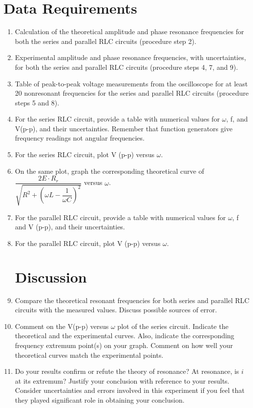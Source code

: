 \section{{\bf Data Requirements}}
\begin{enumerate}[resume]

\item Calculation of the theoretical amplitude and phase resonance frequencies for both the series and parallel RLC circuits (procedure step 2).

\item Experimental amplitude and phase resonance frequencies, with uncertainties, for both the series and parallel RLC circuits (procedure steps 4, 7, and 9).

\item Table of peak-to-peak voltage measurements from the oscilloscope for at least 20 nonresonant frequencies for the series and parallel RLC circuits (procedure steps 5 and 8).

\item For the series RLC circuit, provide a table with numerical values for $\omega$, f, and V(p-p), and their uncertainties. Remember that function generators give frequency readings not angular frequencies.

\item For the series RLC circuit, plot V (p-p) versus $\omega$.

\item On the same plot, graph the corresponding theoretical curve of $\dfrac{2E\cdot R_r}{\sqrt{R^2+\left(\omega L-\dfrac{1}{\omega C}\right)^2}}$ versus $\omega$.

\item For the parallel RLC circuit, provide a table with numerical values for $\omega$, f and V (p-p), and their uncertainties.

\item For the parallel RLC circuit, plot V (p-p) versus $\omega$.

\section{Discussion}
\item Compare the theoretical resonant frequencies for both series and parallel RLC circuits with the measured values. Discuss possible sources of error.

\item Comment on the V(p-p) versus $\omega$ plot of the series circuit. Indicate the theoretical and the experimental curves. Also, indicate the corresponding frequency extremum point(s) on your graph. Comment on how well your theoretical curves match the experimental points.

 \item Do your results confirm or refute the theory of resonance? At resonance, is $i$ at its extremum? Justify your conclusion with reference to your results. Consider uncertainties and errors involved in this experiment if you feel that they played significant role in obtaining your conclusion.

\end{enumerate}

\AtEndDocument{\clearpage\ifodd\value{page}\else\null\clearpage\fi} %



